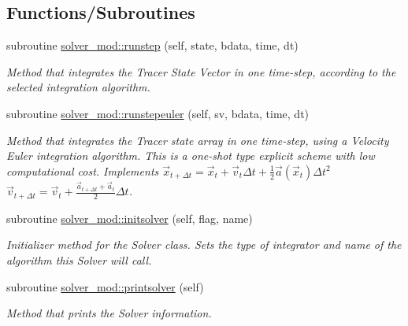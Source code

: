\subsection*{Functions/\+Subroutines}
\begin{DoxyCompactItemize}
\item 
subroutine \mbox{\hyperlink{namespacesolver__mod_a75c5c8b01ae4ae193ff03dbe7e5fc6af}{solver\+\_\+mod\+::runstep}} (self, state, bdata, time, dt)
\begin{DoxyCompactList}\small\item\em Method that integrates the Tracer State Vector in one time-\/step, according to the selected integration algorithm. \end{DoxyCompactList}\item 
subroutine \mbox{\hyperlink{namespacesolver__mod_a21533e195501ebb46c1814aeaede4c55}{solver\+\_\+mod\+::runstepeuler}} (self, sv, bdata, time, dt)
\begin{DoxyCompactList}\small\item\em Method that integrates the Tracer state array in one time-\/step, using a Velocity Euler integration algorithm. This is a one-\/shot type explicit scheme with low computational cost. Implements $ {\vec {x}}_{t+\Delta t}={\vec {x}}_{t}+{\vec {v}}_{t}\Delta t+{\frac {1}{2}}{\vec {a}}({\vec {x}}_{t})\Delta t^{2}$ $ {\vec {v}}_{t+\Delta t}={\vec {v}}_{t}+\frac{{\vec {a}}_{t+\Delta t}+{\vec {a}}_{t}}{2}\Delta t$. \end{DoxyCompactList}\item 
subroutine \mbox{\hyperlink{namespacesolver__mod_a326292ff19880a914317109520b200b2}{solver\+\_\+mod\+::initsolver}} (self, flag, name)
\begin{DoxyCompactList}\small\item\em Initializer method for the Solver class. Sets the type of integrator and name of the algorithm this Solver will call. \end{DoxyCompactList}\item 
subroutine \mbox{\hyperlink{namespacesolver__mod_a54ea6899cce026a7a5da2dd05922628f}{solver\+\_\+mod\+::printsolver}} (self)
\begin{DoxyCompactList}\small\item\em Method that prints the Solver information. \end{DoxyCompactList}\end{DoxyCompactItemize}
